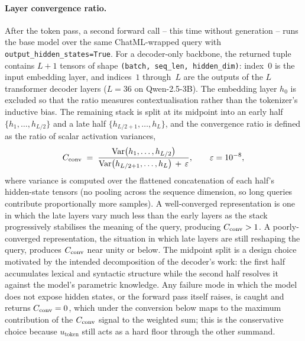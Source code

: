 \paragraph{Layer convergence ratio.}
After the token pass, a second forward call -- this time without generation -- runs the base model over the same ChatML-wrapped query with \texttt{output\_hidden\_states=True}. For a decoder-only backbone, the returned tuple contains $L+1$ tensors of shape \texttt{(batch, seq\_len, hidden\_dim)}: index~$0$ is the input embedding layer, and indices~$1$ through~$L$ are the outputs of the $L$ transformer decoder layers ($L = 36$ on Qwen-2.5-3B). The embedding layer $h_{0}$ is excluded so that the ratio measures contextualisation rather than the tokenizer's inductive bias. The remaining stack is split at its midpoint into an early half $\{h_{1},\dots,h_{L/2}\}$ and a late half $\{h_{L/2+1},\dots,h_{L}\}$, and the convergence ratio is defined as the ratio of scalar activation variances,
\begin{equation}
C_{\text{conv}} \;=\; \frac{\mathrm{Var}\bigl(h_{1},\dots,h_{L/2}\bigr)}{\mathrm{Var}\bigl(h_{L/2+1},\dots,h_{L}\bigr) \,+\, \varepsilon},
\qquad \varepsilon = 10^{-8},
\label{eq:cconv}
\end{equation}
where variance is computed over the flattened concatenation of each half's hidden-state tensors (no pooling across the sequence dimension, so long queries contribute proportionally more samples). A well-converged representation is one in which the late layers vary much less than the early layers as the stack progressively stabilises the meaning of the query, producing $C_{\text{conv}} > 1$. A poorly-converged representation, the situation in which late layers are still reshaping the query, produces $C_{\text{conv}}$ near unity or below. The midpoint split is a design choice motivated by the intended decomposition of the decoder's work: the first half accumulates lexical and syntactic structure while the second half resolves it against the model's parametric knowledge. Any failure mode in which the model does not expose hidden states, or the forward pass itself raises, is caught and returns $C_{\text{conv}} = 0$, which under the conversion below maps to the maximum contribution of the $C_{\text{conv}}$ signal to the weighted sum; this is the conservative choice because $u_{\text{token}}$ still acts as a hard floor through the other summand.

